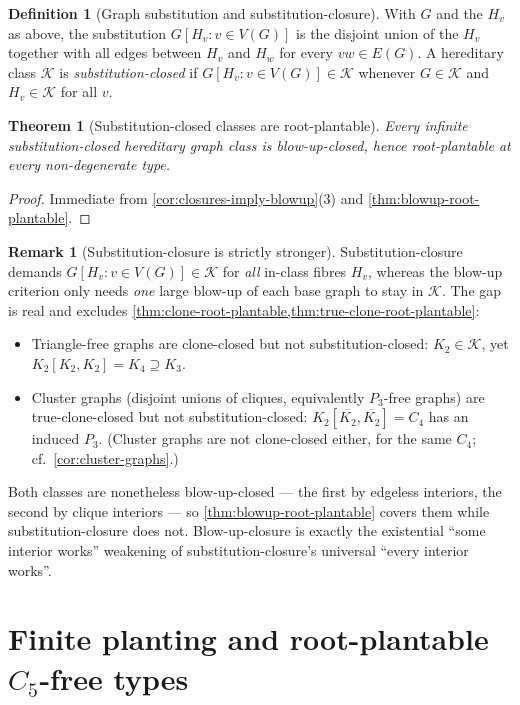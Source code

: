 \documentclass[11pt]{article}
\newtheorem{theorem}{Theorem}
\theoremstyle{definition}
\newtheorem{definition}[definition]{Definition}
\newtheorem{remark}[remark]{Remark}
\newcommand{\K}{\mathcal{K}}
\begin{document}
\begin{definition}[Graph substitution and substitution-closure]\label{def:substitution-closed}
With $G$ and the $H_v$ as above, the substitution $G[H_v:v\in V(G)]$ is the disjoint union
of the $H_v$ together with all edges between $H_v$ and $H_w$ for every $vw\in E(G)$.  A
hereditary class $\K$ is \emph{substitution-closed} if $G[H_v:v\in V(G)]\in\K$ whenever
$G\in\K$ and $H_v\in\K$ for all $v$.
\end{definition}

\begin{theorem}[Substitution-closed classes are root-plantable]\label{thm:substitution-root-plantable}
Every infinite substitution-closed hereditary graph class is blow-up-closed, hence
root-plantable at every non-degenerate type.
\end{theorem}

\begin{proof}
Immediate from \cref{cor:closures-imply-blowup}(3) and
\cref{thm:blowup-root-plantable}.
\end{proof}

\begin{remark}[Substitution-closure is strictly stronger]\label{rem:strictness}
Substitution-closure demands $G[H_v:v\in V(G)]\in\K$ for \emph{all} in-class fibres $H_v$,
whereas the blow-up criterion only needs \emph{one} large blow-up of each base graph to stay in
$\K$.  The gap is real and excludes \cref{thm:clone-root-plantable,thm:true-clone-root-plantable}:
\begin{itemize}
\item Triangle-free graphs are clone-closed but not substitution-closed: $K_2\in\K$, yet
  $K_2[K_2,K_2]=K_4\supseteq K_3$.
\item Cluster graphs (disjoint unions of cliques, equivalently $P_3$-free graphs) are
  true-clone-closed but not substitution-closed: $K_2[\overline{K_2},\overline{K_2}]=C_4$
  has an induced $P_3$.  (Cluster graphs are not clone-closed either, for the same $C_4$;
  cf.\ \cref{cor:cluster-graphs}.)
\end{itemize}
Both classes are nonetheless blow-up-closed --- the first by edgeless interiors, the second
by clique interiors --- so \cref{thm:blowup-root-plantable} covers them while
substitution-closure does not.  Blow-up-closure is exactly the existential ``some
interior works'' weakening of substitution-closure's universal ``every interior works''.
\end{remark}

\section{Finite planting and root-plantable \texorpdfstring{$C_5$}{C5}-free types}
\end{document}
